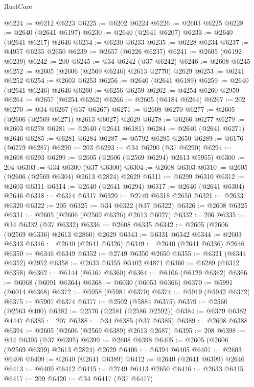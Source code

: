 \begin{lexlean}{RustCore}
\begin{coremodule}
@6224 := @6212 @6223
@6225 := @6202 @6224
@6226 := @2603 @6225
@6228 := @2640 (@2641 @6197)
@6230 := @2640 (@2641 @6207)
@6233 := @2640 (@2641 @6217) @2646
@6234 := @6230 @6233
@6235 := @6228 @6234
@6237 := @4957 @6235 @2650
@6239 := @2657 (@6226 @6237)
@6241 := @2605 (@6192 @6239)
@6242 := 200
@6245 := @34 @6242 (@37 @6242)
@6246 := @2608 @6245
@6252 := @2605 (@2606 (@2569 @6246) @2613 @2770) @2629
@6253 := @6241 @6252
@6254 := @2603 @6253
@6256 := @2640 (@2641 @6189)
@6259 := @2640 (@2641 @6246) @2646
@6260 := @6256 @6259
@6262 := @4254 @6260 @2959
@6264 := @2657 (@6254 @6262)
@6266 := @2605 (@6184 @6264)
@6267 := 202
@6270 := @34 @6267 (@37 @6267)
@6271 := @2608 @6270
@6277 := @2605 (@2606 (@2569 @6271) @2613 @6027) @2629
@6278 := @6266 @6277
@6279 := @2603 @6278
@6281 := @2640 (@2641 @6181)
@6284 := @2640 (@2641 @6271) @2646
@6285 := @6281 @6284
@6287 := @5792 @6285 @2650
@6289 := @6176 (@6279 @6287)
@6290 := 203
@6293 := @34 @6290 (@37 @6290)
@6294 := @2608 @6293
@6299 := @2605 (@2606 (@2569 @6294) @2613 @5955)
@6300 := 204
@6303 := @34 @6300 (@37 @6300)
@6304 := @2608 @6303
@6310 := @2605 (@2606 (@2569 @6304) @2613 @2824) @2629
@6311 := @6299 @6310
@6312 := @2603 @6311
@6314 := @2640 (@2641 @6294)
@6317 := @2640 (@2641 @6304) @2646
@6318 := @6314 @6317
@6320 := @2749 @6318 @2650
@6321 := @2633 @6320
@6322 := 205
@6325 := @34 @6322 (@37 @6322)
@6326 := @2608 @6325
@6331 := @2605 (@2606 (@2569 @6326) @2613 @6027)
@6332 := 206
@6335 := @34 @6332 (@37 @6332)
@6336 := @2608 @6335
@6342 := @2605 (@2606 (@2569 @6336) @2613 @2860) @2629
@6343 := @6331 @6342
@6344 := @2603 @6343
@6346 := @2640 (@2641 @6326)
@6349 := @2640 (@2641 @6336) @2646
@6350 := @6346 @6349
@6352 := @2749 @6350 @2650
@6355 := @6321 (@6344 @6352) @2952
@6358 := @2633 @6355 @5402 @4871
@6360 := @6289 (@6312 @6358)
@6362 := @6144 (@6167 @6360)
@6364 := @6106 (@6129 @6362)
@6366 := @6068 (@6091 @6364)
@6368 := @6030 (@6053 @6366)
@6370 := @5991 (@6014 @6368)
@6372 := @5958 (@5981 @6370)
@6374 := @5919 (@5942 @6372)
@6375 := @5907 @6374
@6377 := @2502 (@5884 @6375)
@6379 := @2560 (@2563 @400)
@6382 := @2576 (@2581 (@2586 @2592))
@6384 := @6379 @6382 @4447
@6385 := 207
@6388 := @34 @6385 (@37 @6385)
@6389 := @2608 @6388
@6394 := @2605 (@2606 (@2569 @6389) @2613 @2687)
@6395 := 208
@6398 := @34 @6395 (@37 @6395)
@6399 := @2608 @6398
@6405 := @2605 (@2606 (@2569 @6399) @2613 @2824) @2629
@6406 := @6394 @6405
@6407 := @2603 @6406
@6409 := @2640 (@2641 @6389)
@6412 := @2640 (@2641 @6399) @2646
@6413 := @6409 @6412
@6415 := @2749 @6413 @2650
@6416 := @2633 @6415
@6417 := 209
@6420 := @34 @6417 (@37 @6417)

\end{coremodule}
\end{lexlean}
